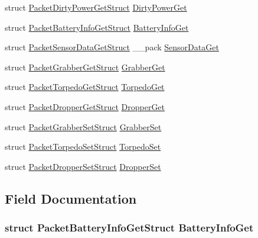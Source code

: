 \begin{DoxyCompactItemize}
\item 
struct \hyperlink{struct_packet_dirty_power_get_struct}{Packet\+Dirty\+Power\+Get\+Struct} \hyperlink{union_packet_union_a1596930764bf51bc03ffb54375005b66}{Dirty\+Power\+Get}
\item 
struct \hyperlink{struct_packet_battery_info_get_struct}{Packet\+Battery\+Info\+Get\+Struct} \hyperlink{union_packet_union_a6cf213104e4be3fa7465c26d597dd99c}{Battery\+Info\+Get}
\item 
struct \hyperlink{struct_packet_sensor_data_get_struct}{Packet\+Sensor\+Data\+Get\+Struct} \+\_\+\+\_\+pack \hyperlink{union_packet_union_ac7fce93edd24cbfb6cf107541c41973f}{Sensor\+Data\+Get}
\item 
struct \hyperlink{struct_packet_grabber_get_struct}{Packet\+Grabber\+Get\+Struct} \hyperlink{union_packet_union_a172ee9bc99eed788b3003a47f853386b}{Grabber\+Get}
\item 
struct \hyperlink{struct_packet_torpedo_get_struct}{Packet\+Torpedo\+Get\+Struct} \hyperlink{union_packet_union_a584ce65208b2639e8c739b5c2a5bee6b}{Torpedo\+Get}
\item 
struct \hyperlink{struct_packet_dropper_get_struct}{Packet\+Dropper\+Get\+Struct} \hyperlink{union_packet_union_a941a56c5f91427ad41923f2943fe63b9}{Dropper\+Get}
\item 
struct \hyperlink{struct_packet_grabber_set_struct}{Packet\+Grabber\+Set\+Struct} \hyperlink{union_packet_union_a0597efad3340cd6aad7e20f88fb64e38}{Grabber\+Set}
\item 
struct \hyperlink{struct_packet_torpedo_set_struct}{Packet\+Torpedo\+Set\+Struct} \hyperlink{union_packet_union_a4152a82cdb15d94a2cd3835c3c543019}{Torpedo\+Set}
\item 
struct \hyperlink{struct_packet_dropper_set_struct}{Packet\+Dropper\+Set\+Struct} \hyperlink{union_packet_union_ad6f4a6bfd5d07b33f02725f971990000}{Dropper\+Set}
\end{DoxyCompactItemize}


\subsection{Field Documentation}
\hypertarget{union_packet_union_a6cf213104e4be3fa7465c26d597dd99c}{}
\subsubsection[{Battery\+Info\+Get}]{\setlength{\rightskip}{0pt plus 5cm}struct {\bf Packet\+Battery\+Info\+Get\+Struct} Battery\+Info\+Get}\label{union_packet_union_a6cf213104e4be3fa7465c26d597dd99c}
\hypertarget{union_packet_union_a1e3518ac5318a26cf207a8205b8cee9d}{}
